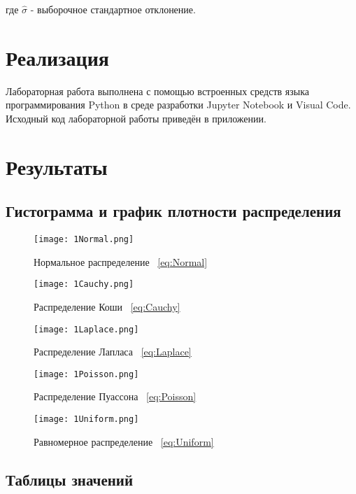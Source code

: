 \documentclass[12pt,a4paper]{scrartcl}
\begin{document}
где $\hat{\sigma}$ - выборочное стандартное отклонение.

\section {Реализация}
Лабораторная работа выполнена с помощью встроенных средств языка программирования Python в среде разработки Jupyter Notebook и Visual Code. Исходный код лабораторной
работы приведён в приложении.
 
\section{Результаты}

\subsection{Гистограмма и график плотности распределения}
\begin{figure}[H]
  \centering
  \texttt{[image: 1Normal.png]}
  \caption{Нормальное распределение ~\eqref{eq:Normal}}
 
\end{figure}
\begin{figure}[H]
  \centering
  \texttt{[image: 1Cauchy.png]}
  \caption{Распределение Коши ~\eqref{eq:Cauchy}}
\end{figure}
\begin{figure}[H]
\centering
  \texttt{[image: 1Laplace.png]}
  \caption{Распределение Лапласа ~\eqref{eq:Laplace}}
\end{figure}
\begin{figure}[H]
  \centering
  \texttt{[image: 1Poisson.png]}
  \caption{Распределение Пуассона ~\eqref{eq:Poisson}}
\end{figure}
\begin{figure}[H]
  \centering
  \texttt{[image: 1Uniform.png]}
  \caption{Равномерное распределение ~\eqref{eq:Uniform}}
\end{figure}

\subsection{Таблицы значений}
\end{document}

